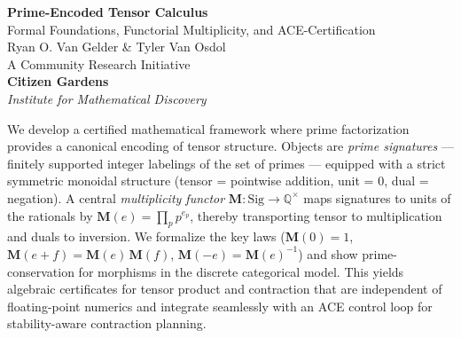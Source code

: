 \documentclass[11pt]{article}
\theoremstyle{plain}
\theoremstyle{definition}
\newcommand{\Q}{\mathbb{Q}}
\newcommand{\Sig}{\mathrm{Sig}}
\newcommand{\M}{\mathbf{M}} %
\begin{document}
\begin{titlepage}
    \centering
 

\vspace*{1em}
  \Huge\textbf{Prime-Encoded Tensor Calculus}\\
  \Large{Formal Foundations, Functorial Multiplicity, and ACE-Certification}
    \vspace{1cm} \\
     \Large{Ryan O. Van Gelder \& Tyler Van Osdol}\\
   \vspace{1cm}
     \Large{A Community Research Initiative}
  \vspace{.5cm} \\
     {\bfseries Citizen Gardens}\\
     \vspace{.5cm}
    \textit{Institute for Mathematical Discovery}\\
     \vspace{1cm}
    \vfill

   
    \vspace{0.5em}
    \begin{minipage}{0.85\textwidth}
        \small
We develop a certified mathematical framework where prime factorization provides a canonical encoding of tensor structure. Objects are \emph{prime signatures} --- finitely supported integer labelings of the set of primes --- equipped with a strict symmetric monoidal structure (tensor = pointwise addition, unit = $0$, dual = negation). A central \emph{multiplicity functor} $\M:\Sig\to \Q^{\times}$ maps signatures to units of the rationals by $\M(e)=\prod_{p} p^{e_p}$, thereby transporting tensor to multiplication and duals to inversion. We formalize the key laws ($\M(0)=1$, $\M(e+f)=\M(e)\,\M(f)$, $\M(-e)=\M(e)^{-1}$) and show prime-conservation for morphisms in the discrete categorical model. This yields algebraic certificates for tensor product and contraction that are independent of floating-point numerics and integrate seamlessly with an ACE control loop for stability-aware contraction planning.


    \end{minipage}

\end{titlepage}

\tableofcontents
\end{document}
